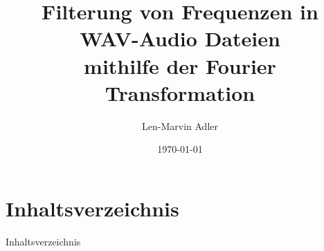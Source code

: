 \documentclass{beamer}
\title{Filterung von Frequenzen in \\WAV-Audio Dateien \\ mithilfe der Fourier Transformation}
\author{Len-Marvin Adler}
\institute{Hochschule Bonn-Rhein-Sieg}
\date{\today}
\begin{document}
\frame{\titlepage}

\section*{Inhaltsverzeichnis}
\begin{frame}{Inhaltsverzeichnis}
	\tableofcontents
\end{frame}













\end{document}
